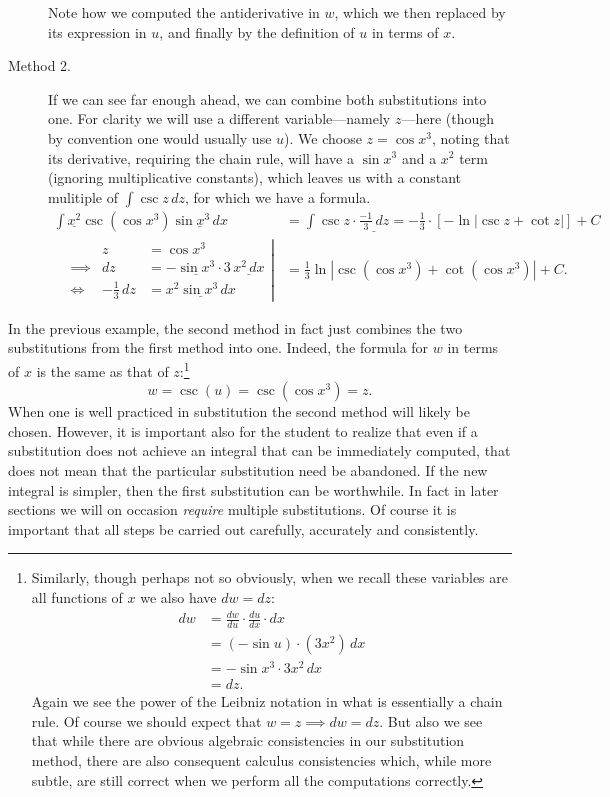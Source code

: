 \begin{description}
Note how we computed the antiderivative in $w$, which we
then replaced by its expression in $u$, and finally by
the definition of $u$ in terms of $x$.
\item[Method 2.] If we can see far enough ahead, we can combine
both substitutions into one.  For clarity we will use a different
variable---namely $z$---here (though by convention
one would usually use $u$).  We choose $z=\cos x^3$, noting
that its derivative, requiring the chain rule, will have
a $\sin x^3$ and a $x^2$ term (ignoring multiplicative constants),
which leaves us with a constant mulitiple of $\int\csc z\,dz$, for
which we have a formula.  
\begin{align*}
\int \underline{x^2}\csc\left(\cos x^3\right)\underline{\sin x^3\,dx}
 &=\int\csc z\cdot\underline{\frac{-1}3\,dz}
 =-\frac13\cdot[-\ln|\csc z+\cot z|]+C\\
\left.\begin{alignedat}{2}
& &z&=\cos x^3\\
&\implies &dz&=-\underline{\sin x^3}\cdot3\,\underline{x^2\,dx}\\
&\iff&-\frac13\,dz&=\underline{x^2\sin x^3\,dx}\end{alignedat}\right|
&=\frac13\ln\left|\csc\left(\cos x^3\right)
                  +\cot\left(\cos x^3\right)\right|+C.\end{align*}
\end{description}
\eex

In the previous example, the second method in fact just combines
the two substitutions from the first method into one.  Indeed,
the formula for $w$ in terms of $x$ is the same as that of 
$z$:\footnote{%
Similarly, though perhaps not so obviously, when we recall
these variables are all functions of $x$ we also have $dw=dz$:
\begin{align*}
dw&=\frac{dw}{du}\cdot\frac{du}{dx}\cdot dx\\
  &=(-\sin u)\cdot\left(3x^2\right)\,dx\\
  &=-\sin x^3\cdot 3x^2\,dx\\
  &=dz.\end{align*}
Again we see the power of the Leibniz notation in what is essentially
a chain rule.  Of course we should expect that $w=z\implies dw=dz$.
But also we see that while there are obvious algebraic consistencies
in our substitution method, there are also consequent
calculus consistencies which, while more subtle, are still correct
when we perform all the computations correctly.
}
$$w=\csc(u)=\csc\left(\cos x^3\right)=z.$$
When one is well practiced in substitution the second method will
likely be chosen.  However, it is important also for the student
to realize that even if a substitution does not achieve an
integral that can be immediately computed, that does not mean
that the particular substitution need be abandoned.  If the
new integral is simpler, then the
first substitution can be worthwhile.  In fact in later sections
we will on occasion {\it require} multiple substitutions.
Of course it is important that all steps be carried out 
carefully, accurately and consistently.  

